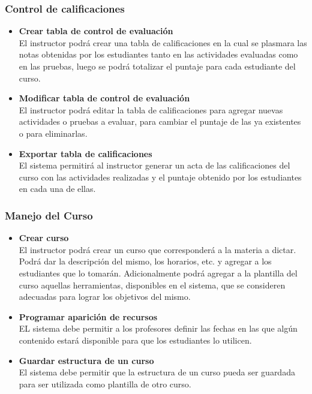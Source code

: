 \subsubsection{Control de calificaciones}
\begin{itemize}
	\item \textbf{Crear tabla de control de evaluación}\\
	El instructor podrá crear una tabla de calificaciones en la cual se plasmara las notas obtenidas por los estudiantes tanto en las actividades evaluadas como en las pruebas, luego se podrá totalizar el puntaje para cada estudiante del curso. 
	\item \textbf{Modificar tabla de control de evaluación}\\
	El instructor podrá editar la tabla de calificaciones para agregar nuevas actividades o pruebas a evaluar, para cambiar el puntaje de las ya existentes o para eliminarlas. 
	\item \textbf{Exportar tabla de calificaciones}\\
	El sistema permitirá al instructor generar un acta de las calificaciones del curso con las actividades realizadas y el puntaje obtenido por los estudiantes en cada una de ellas.
\end{itemize}

\subsubsection{Manejo del Curso}
\begin{itemize}
	\item \textbf{Crear curso}\\
	El instructor podrá crear un curso que corresponderá a la materia a dictar. Podrá dar la descripción del mismo, los horarios, etc. y agregar a los estudiantes que lo tomarán. Adicionalmente podrá agregar a la plantilla del curso aquellas herramientas, disponibles en el sistema, que se consideren adecuadas para lograr los objetivos del mismo.
	\item \textbf{Programar aparición de recursos}\\
	EL sistema debe permitir a los profesores definir las fechas en las que algún contenido estará disponible para que los estudiantes lo utilicen.
	\item \textbf{Guardar estructura de un curso}\\
	El sistema debe permitir que la estructura de un curso pueda ser guardada para ser utilizada como plantilla de otro curso.
\end{itemize}

